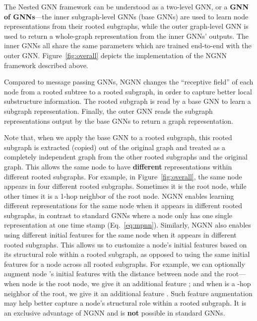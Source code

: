 \documentclass{article}
\begin{document}
The Nested GNN framework can be understood as a two-level GNN, or a \textbf{GNN of GNNs}---the inner subgraph-level GNNs (base GNNs) are used to learn node representations from their rooted subgraphs, while the outer graph-level GNN is used to return a whole-graph representation from the inner GNNs' outputs. The inner GNNs all share the same parameters which are trained end-to-end with the outer GNN. Figure~\ref{fig:overall} depicts the implementation of the NGNN framework described above.




Compared to message passing GNNs, NGNN changes the ``receptive field'' of each node from a rooted subtree to a rooted subgraph, in order to capture better local substructure information. The rooted subgraph is read by a base GNN to learn a subgraph representation. Finally, the outer GNN reads the subgraph representations output by the base GNNs to return a graph representation.

Note that, when we apply the base GNN to a rooted subgraph, this rooted subgraph is extracted (copied) out of the original graph and treated as a completely independent graph from the other rooted subgraphs and the original graph.
This allows the same node to have \textbf{different} representations within different rooted subgraphs. For example, in Figure~\ref{fig:overall}, the same node  appears in four different rooted subgraphs. Sometimes it is the root node, while other times it is a 1-hop neighbor of the root node. NGNN enables learning different representations for the same node when it appears in different rooted subgraphs, in contrast to standard GNNs where a node only has one single representation at one time stamp (Eq.~\ref{eq:mpnn}). Similarly, NGNN also enables using different initial features for the same node when it appears in different rooted subgraphs. This allows us to customize a node's initial features based on its structural role within a rooted subgraph, as opposed to using the same initial features for a node across all rooted subgraphs. For example, we can optionally augment node 's initial features with the distance between node  and the root---when node  is the root node, we give it an additional feature ; and when  is a -hop neighbor of the root, we give it an additional feature . Such feature augmentation may help better capture a node's structural role within a rooted subgraph. It is an exclusive advantage of NGNN and is \textbf{not} possible in standard GNNs.
\end{document}
